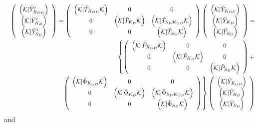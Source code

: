 \begin{eqnarray}
&&\left( 
\begin{array}{c}
\left( {\cal K}|\breve{Y}_{K_{OD}}^{\prime }\right) \\ 
\left( {\cal K}|\breve{Y}_{K_{D}}^{\prime }\right) \\ 
\left( {\cal K}|\breve{Y}_{S_{D}}^{\prime }\right)%
\end{array}%
\right) =\left( 
\begin{array}{ccc}
\left( {\cal K}|\hat{T}_{K_{OD}}{\cal K}\right) & 0 & 0 \\ 
0 & \left( {\cal K}|\hat{T}_{K_{D}}{\cal K}\right) & \left( {\cal K}|\hat{T}%
_{S_{D}K_{OD}}{\cal K}\right) \\ 
0 & 0 & \left( {\cal K}|\hat{T}_{S_{D}}{\cal K}\right)%
\end{array}%
\right) \left( 
\begin{array}{c}
\left( {\cal K}|\breve{Y}_{K_{OD}}\right) \\ 
\left( {\cal K}|\breve{Y}_{K_{D}}\right) \\ 
\left( {\cal K}|\breve{Y}_{S_{D}}\right)%
\end{array}%
\right) =  \nonumber \\
&&\left\{ \left( 
\begin{array}{ccc}
\left( {\cal K}|\hat{P}_{K_{OD}}{\cal K}\right) & 0 & 0 \\ 
0 & \left( {\cal K}|\hat{P}_{K_{D}}{\cal K}\right) & 0 \\ 
0 & 0 & \left( {\cal K}|\hat{P}_{S_{D}}{\cal K}\right)%
\end{array}%
\right) +\right.  \nonumber \\
&&\qquad \qquad \qquad \left. \left( 
\begin{array}{ccc}
\left( {\cal K}|\hat{\Phi}_{K_{OD}}{\cal K}\right) & 0 & 0 \\ 
0 & \left( {\cal K}|\hat{\Phi}_{K_{D}}{\cal K}\right) & \left( {\cal K}|\hat{%
\Phi}_{S_{D}K_{OD}}{\cal K}\right) \\ 
0 & 0 & \left( {\cal K}|\hat{\Phi}_{S_{D}}{\cal K}\right)%
\end{array}%
\right) \right\} \left( 
\begin{array}{c}
\left( {\cal K}|\breve{Y}_{K_{OD}}\right) \\ 
\left( {\cal K}|\breve{Y}_{K_{D}}\right) \\ 
\left( {\cal K}|\breve{Y}_{S_{D}}\right)%
\end{array}%
\right)
\end{eqnarray}%
and 
